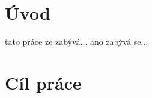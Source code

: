\documentclass[twoside]{ctuthesis}
\theoremstyle{plain}
\theoremstyle{definition}
\theoremstyle{note}
\begin{document}
\maketitle

\chapter{Úvod}
tato práce ze zabývá... ano zabývá se...



\chapter{Cíl práce}




\end{document}
